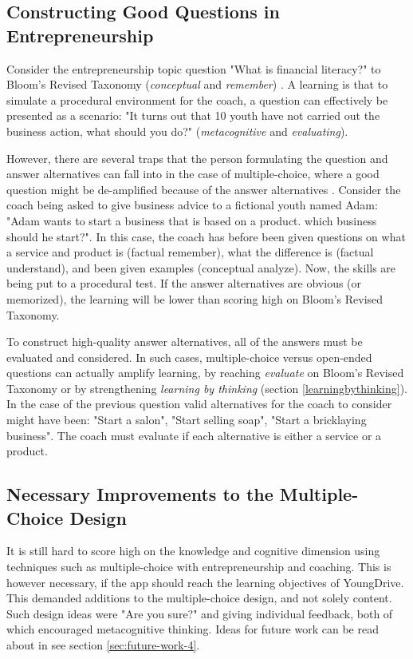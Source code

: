   \subsection{Constructing Good Questions in Entrepreneurship}

  Consider the entrepreneurship topic question "What is financial literacy?" to Bloom's Revised Taxonomy (\textit{conceptual} and \textit{remember}) \citep{krathwohl}. A learning is that to simulate a procedural environment for the coach, a question can effectively be presented as a scenario: "It turns out that 10 youth have not carried out the business action, what should you do?" (\textit{metacognitive} and \textit{evaluating}).

  However, there are several traps that the person formulating the question and answer alternatives can fall into in the case of multiple-choice, where a good question might be de-amplified because of the answer alternatives \citep{nicol}. Consider the coach being asked to give business advice to a fictional youth named Adam: "Adam wants to start a business that is based on a product. which business should he start?". In this case, the coach has before been given questions on what a service and product is (factual remember), what the difference is (factual understand), and been given examples (conceptual analyze). Now, the skills are being put to a procedural test. If the answer alternatives are obvious (or memorized), the learning will be lower than scoring high on Bloom's Revised Taxonomy.

  To construct high-quality answer alternatives, all of the answers must be evaluated and considered. In such cases, multiple-choice versus open-ended questions can actually amplify learning, by reaching \textit{evaluate} on Bloom's Revised Taxonomy or by strengthening \textit{learning by thinking} (section \ref{learningbythinking}). In the case of the previous question valid alternatives for the coach to consider might have been: "Start a salon", "Start selling soap", "Start a bricklaying business". The coach must evaluate if each alternative is either a service or a product.

  \subsection{Necessary Improvements to the Multiple-Choice Design}
  It is still hard to score high on the knowledge and cognitive dimension using techniques such as multiple-choice with entrepreneurship and coaching. This is however necessary, if the app should reach the learning objectives of YoungDrive. This demanded additions to the multiple-choice design, and not solely content. Such design ideas were "Are you sure?" and giving individual feedback, both of which encouraged metacognitive thinking. Ideas for future work can be read about in see section \ref{sec:future-work-4}.

